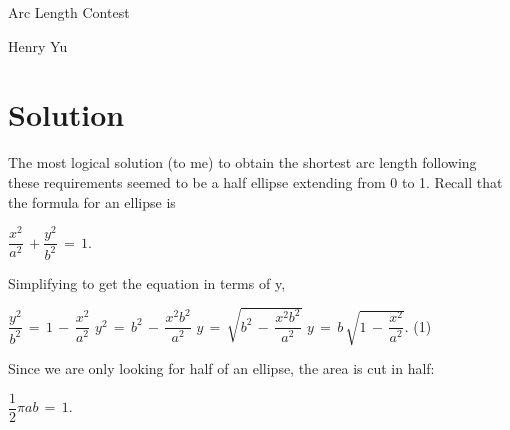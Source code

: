 \documentclass[letterpaper,12pt]{article}
\theoremstyle{definition}
\begin{document}
\begin{titlepage}

  \begin{center}

    \vspace*{\fill}

    \vspace*{0.5cm}

    \huge{Arc Length Contest}

    \vspace*{0.5cm}

    \large{Henry Yu}

    \vspace*{\fill}

  \end{center}

\end{titlepage}

\newpage

\raggedright

\section*{Solution}

The most logical solution (to me) to obtain the shortest arc length following these requirements seemed to be a half ellipse extending from 0 to 1.
\newline
Recall that the formula for an ellipse is

\begin{center}
    $\dfrac{x^2}{a^2}\,+\dfrac{y^2}{b^2}\,=\,1$.
\end{center}

Simplifying to get the equation in terms of y,

\begin{center}
    $\dfrac{y^2}{b^2}\,=\,1\,-\,\dfrac{x^2}{a^2}$
    \vskip 16pt
    $y^2\,=\,b^2\,-\,\dfrac{x^2b^2}{a^2}$
    \vskip 16pt
    $y\,=\,\sqrt{b^2\,-\,\dfrac{x^2b^2}{a^2}}$
    \vskip 16pt
    \hspace{5.5cm}$y\,=\,b\,\sqrt{1\,-\,\dfrac{x^2}{a^2}}$. \hspace{5cm}(1)
\end{center}

Since we are only looking for half of an ellipse, the area is cut in half:

\begin{center}
    $\dfrac{1}{2}\pi ab\,=\,1$.
\end{center}
\end{document}
